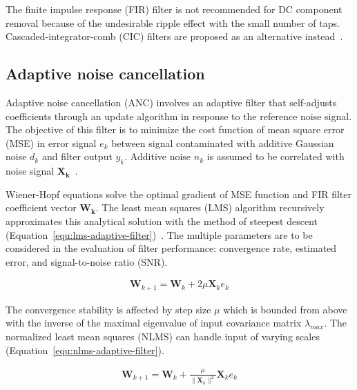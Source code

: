 The finite impulse response (FIR) filter is not recommended for DC component removal because of the undesirable ripple effect with the small number of taps. Cascaded-integrator-comb (CIC) filters are proposed as an alternative instead~\cite{lyons_understanding_2011}.

\subsection{Adaptive noise cancellation}
Adaptive noise cancellation (ANC) involves an adaptive filter that self-adjusts coefficients through an update algorithm in response to the reference noise signal.  The objective of this filter is to minimize the cost function of mean square error (MSE) in error signal $e_k$ between signal contaminated with additive Gaussian noise $d_k$ and filter output $y_k$. Additive noise $n_k$ is assumed to be correlated with noise signal $\mathbf{X_k}$~\cite{diniz_adaptive_2020}.

Wiener-Hopf equations solve the optimal gradient of MSE function and FIR filter coefficient vector $\mathbf{W_k}$.  The least mean squares (LMS) algorithm recursively approximates this analytical solution with the method of steepest descent (Equation~\ref{equ:lms-adaptive-filter})~\cite{diniz_adaptive_2020}. The multiple parameters are to be considered in the evaluation of filter performance: convergence rate, estimated error, and signal-to-noise ratio (SNR).

\begin{ceqn}\begin{align} \label{equ:lms-adaptive-filter}
\mathbf{W}_{k+1} = \mathbf{W}_{k} + 2 \mu \mathbf{X}_{k}  e_k
\end{align}\end{ceqn}

The convergence stability is affected by step size $\mu$ which is bounded from above with the inverse of the maximal eigenvalue of input covariance matrix $\lambda_{max}$. The normalized least mean squares (NLMS) can handle input of varying scales  (Equation~\ref{equ:nlms-adaptive-filter}).

\begin{ceqn}\begin{align} \label{equ:nlms-adaptive-filter}
\mathbf{W}_{k+1} = \mathbf{W}_{k} + \frac{\mu}{\lVert\mathbf{X}_{k}\rVert^2} \mathbf{X}_{k}  e_k
\end{align}\end{ceqn}

